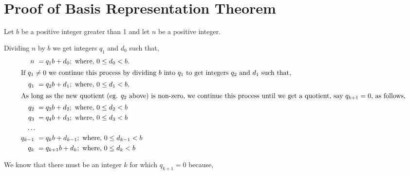 \documentclass{article}
\begin{document}
\section*{Proof of Basis Representation Theorem}

Let \(b\) be a positive integer greater than 1 and
let \(n\) be a positive integer.

Dividing \(n\) by \(b\) we get integers \(q_1\) and \(d_0\) such that,
\begin{alignat*}{1}
n\ &= q_1b + d_0; \text{ where, } 0 \le{} d_0 < b.\\
\intertext{If \(q_1 \ne{} 0\) we continue this process by dividing \(b\) into \(q_1\) to get integers \(q_2\) and \(d_1\) such that,}
q_1\ &= q_2b + d_1; \text{ where, } 0 \le{} d_1 < b,\\
\intertext{As long as the new quotient (eg. \(q_2\) above) is non-zero, we continue this process
until we get a quotient, say \(q_{k+1} = 0\), as follows,}
q_2\ &= q_3b + d_2; \text{ where, } 0 \le{} d_2 < b\\
q_3\ &= q_4b + d_3; \text{ where, } 0 \le{} d_3 < b\\
\dots{}\\
q_{k-1}\ &= q_{k}b + d_{k-1}; \text{ where, } 0 \le{} d_{k-1} < b\\
q_{k}\ &= q_{k+1}b + d_k; \text{ where, } 0 \le{} d_k < b
\end{alignat*}

We know that there must be an integer \(k\) for which \(q_{k+1} = 0\) because,
\end{document}
